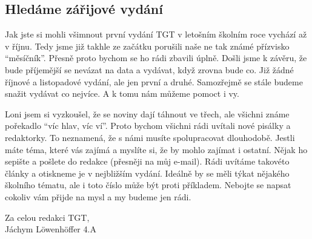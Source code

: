 \documentclass[12pt, a4paper]{article}
\begin{document}
	\begin{multicols*}{2}
		\setlength{\columnseprule}{1pt}
		
		
		\begin{center}\section*{Hledáme zářijové vydání} \end{center}
		Jak jste si mohli všimnout první vydání TGT v letošním školním roce vychází až v říjnu. Tedy jsme již takhle ze začátku porušili naše ne tak známé přízvisko “měsíčník”. Přesně proto bychom se ho rádi zbavili úplně. Došli jsme k závěru, že bude příjemější se nevázat na data a vydávat, když zrovna bude co. Již žádné říjnové a listopadové vydání, ale jen první a druhé. Samozřejmě se stále budeme snažit vydávat co nejvíce. A k tomu nám můžeme pomoct i vy. \par
		Loni jsem si vyzkoušel, že se noviny dají táhnout ve třech, ale všichni známe pořekadlo “víc hlav, víc ví”. Proto bychom všichni rádi uvítali nové pisálky a redaktorky. To neznamená, že s námi musíte spolupracovat dlouhodobě. Jestli máte téma, které vás zajímá a myslíte si, že by mohlo zajímat i ostatní. Nějak ho sepište a pošlete do redakce (přesněji na můj e-mail). Rádi uvítáme takovéto články a otiskneme je v nejbližším vydání. Ideálně by se měli týkat nějakého školního tématu, ale i toto číslo může být proti příkladem. Nebojte se napsat cokoliv vám přijde na mysl a my budeme jen rádi. \par 
		\begin{flushright}
			Za celou redakci TGT,\\Jáchym Löwenhöffer 4.A
		\end{flushright}
		
		
		


	\end{multicols*}
\end{document}
